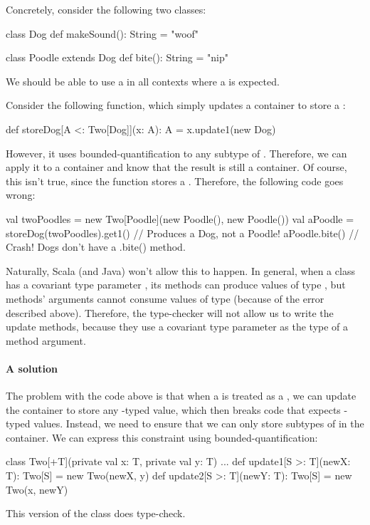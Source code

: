 \documentclass[9pt]{extbook}
\begin{document}
Concretely, consider the following two classes:
\begin{scalacode}
class Dog {
  def makeSound(): String = "woof"
}

class Poodle extends Dog {
  def bite(): String = "nip"
}
\end{scalacode}

We should be able to use a  in all contexts where
a  is expected.


Consider the following function, which simply updates a container to
store a :
\begin{scalacode}
def storeDog[A <: Two[Dog]](x: A): A = x.update1(new Dog)
\end{scalacode}
However, it uses bounded-quantification to any subtype of
. Therefore, we can apply it to a 
container and know that the result is still a 
container. Of course, this isn't true, since the function stores
a . Therefore, the following code goes wrong:
\begin{scalacode}
val twoPoodles = new Two[Poodle](new Poodle(), new Poodle())
val aPoodle = storeDog(twoPoodles).get1() // Produces a Dog, not a Poodle!
aPoodle.bite() // Crash! Dogs don't have a .bite() method.
\end{scalacode}

Naturally, Scala (and Java) won't allow this to happen. In general, when
a class has a covariant type parameter , its methods can
produce values of type , but methods' arguments cannot consume
values of type  (because of the error described above). Therefore, the type-checker
will not allow us to write the update methods, because they use
a covariant type parameter as the type of a method argument.

\paragraph{A solution}
The problem with the code above is that when a 
is treated as a , we can update the container to
store any -typed value, which then breaks code that expects
-typed values. Instead, we need to ensure that we can only store
subtypes of  in the container. We can express this constraint
using bounded-quantification:

\begin{scalacode}
class Two[+T](private val x: T, private val y: T) {
  ...
  def update1[S >: T](newX: T): Two[S] = new Two(newX, y)
  def update2[S >: T](newY: T): Two[S] = new Two(x, newY)
}
\end{scalacode}
This version of the class does type-check.
\end{document}
